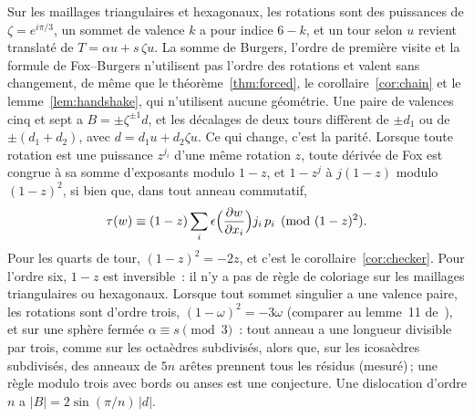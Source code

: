 \documentclass[11pt,a4paper]{article}
\newcommand{\shift}{s}
\begin{document}
Sur les maillages triangulaires et hexagonaux, les rotations sont des
puissances de $\zeta = e^{i\pi/3}$, un sommet de valence $k$ a pour indice $6
- k$, et un tour selon $u$ revient translaté de $T = \alpha u + \shift\, \zeta
u$. La somme de Burgers, l'ordre de première visite et la formule de
Fox--Burgers n'utilisent pas l'ordre des rotations et valent sans changement,
de même que le théorème~\ref{thm:forced}, le corollaire~\ref{cor:chain} et le
lemme~\ref{lem:handshake}, qui n'utilisent aucune géométrie. Une paire de
valences cinq et sept a $B = \pm\zeta^{\pm1} d$, et les décalages de deux
tours diffèrent de $\pm d_1$ ou de $\pm(d_1 + d_2)$, avec $d = d_1 u + d_2
\zeta u$. Ce qui change, c'est la parité. Lorsque toute rotation est une
puissance $z^{j_i}$ d'une même rotation $z$, toute dérivée de Fox est
congrue à sa somme d'exposants modulo $1 - z$, et $1 - z^j$ à $j(1 - z)$
modulo $(1 - z)^2$, si bien que, dans tout anneau commutatif,
\[
  \tau(w) \equiv (1 - z) \sum_i \epsilon\Bigl(\frac{\partial w}{\partial
  x_i}\Bigr) j_i\, p_i \pmod{(1 - z)^2}.
\]
Pour les quarts de tour, $(1 - z)^2 = -2z$, et c'est le
corollaire~\ref{cor:checker}. Pour l'ordre six, $1 - z$ est inversible~: il
n'y a pas de règle de coloriage sur les maillages triangulaires ou
hexagonaux. Lorsque tout sommet singulier a une valence paire, les rotations
sont d'ordre trois, $(1 - \omega)^2 = -3\omega$ (comparer au lemme~11
de~\cite{izmestiev2013torus}), et sur une sphère fermée $\alpha \equiv \shift
\pmod 3$~: tout anneau a une longueur divisible par trois, comme sur les
octaèdres subdivisés, alors que, sur les icosaèdres subdivisés, des anneaux de
$5n$ arêtes prennent tous les résidus (mesuré)\,; une règle modulo trois avec
bords ou anses est une conjecture. Une dislocation d'ordre $n$ a $|B| =
2\sin(\pi/n)\,|d|$.
\end{document}

